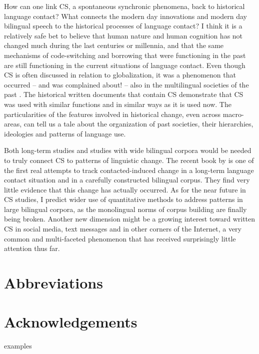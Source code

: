 \documentclass[output=paper,
modfonts
]{langscibook}
\begin{document}
How can one link CS, a spontaneous synchronic phenomena, back to historical language contact? What connects the modern day innovations and modern day bilingual speech to the historical processes of language contact? I think it is a relatively safe bet to believe that human nature and human cognition has not changed much during the last centuries or millennia, and that the same mechanisms of code-switching and borrowing that were functioning in the past are still functioning in the current situations of language contact. Even though CS is often discussed in relation to globalization, it was a phenomenon that occurred – and was complained about! – also in the multilingual societies of the past \parencite{lantto20165}. The historical written documents that contain CS demonstrate that CS was used with similar functions and in similar ways as it is used now. The particularities of the features involved in historical change, even across macro-areas, can tell us a tale about the organization of past societies, their hierarchies, ideologies and patterns of language use. 

Both long-term studies and studies with wide bilingual corpora would be needed to truly connect CS to patterns of linguistic change. The recent book by \cite{cacoullos2018bilingualism} is one of the first real attempts to track contacted-induced change in a long-term language contact situation and in a carefully constructed bilingual corpus. They find very little evidence that this change has actually occurred. As for the near future in CS studies, I predict wider use of quantitative methods to address patterns in large bilingual corpora, as the monolingual norms of corpus building are finally being broken. Another new dimension might be a growing interest toward written CS in social media, text messages and in other corners of the Internet, a very common and multi-faceted phenomenon that has received surprisingly little attention thus far.


\section*{Abbreviations}
\section*{Acknowledgements}examples

\printbibliography[heading=subbibliography,notkeyword=this]
% 
% 
\end{document}
